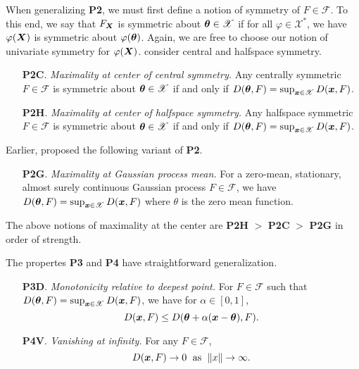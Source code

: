 When generalizing \textbf{P2}, we must first define a notion of symmetry of $F
\in \mathscr{F}$.
To this end, we say that $F_{\bm{X}}$ is symmetric about $\bm{\theta} \in \mathscr{X}$
if for all $\varphi \in \mathscr{X}^*$, we have $\varphi(\bm{X})$ is symmetric
about $\varphi(\bm{\theta})$.
Again, we are free to choose our notion of univariate symmetry for
$\varphi(\bm{X})$.
\textcite{gijbels-nagy-2017} consider central and halfspace symmetry.

\begin{enumerate}
    \item[\textbf{P2C}.] \emph{Maximality at center of central symmetry.}
    Any centrally symmetric $F \in \mathscr{F}$ is symmetric about $\bm{\theta} \in
    \mathscr{X}$ if and only if $D(\bm{\theta}, F) = \sup_{\bm{x} \in \mathscr{X}}
    D(\bm{x}, F)$.

    \item[\textbf{P2H}.] \emph{Maximality at center of halfspace symmetry.}
    Any halfspace symmetric $F \in \mathscr{F}$ is symmetric about $\bm{\theta} \in
    \mathscr{X}$ if and only if $D(\bm{\theta}, F) = \sup_{\bm{x} \in \mathscr{X}}
    D(\bm{x}, F)$.
\end{enumerate}

Earlier, \textcite{reyes-battey-2016} proposed the following variant of
\textbf{P2}.
\begin{enumerate}
    \item[\textbf{P2G}.] \emph{Maximality at Gaussian process mean.}
    For a zero-mean, stationary, almost surely continuous Gaussian process $F
    \in \mathscr{F}$, we have $D(\bm{\theta}, F) = \sup_{\bm{x} \in \mathscr{X}} D(\bm{x},
    F)$ where $\theta$ is the zero mean function.
\end{enumerate}
The above notions of maximality at the center are \textbf{P2H} $>$
\textbf{P2C} $>$ \textbf{P2G} in order of strength.

The propertes \textbf{P3} and \textbf{P4} have straightforward generalization.
\begin{enumerate}
    \item[\textbf{P3D}.] \emph{Monotonicity relative to deepest point.}
    For $F \in \mathscr{F}$ such that $D(\bm{\theta}, F) = \sup_{\bm{x} \in \mathscr{X}}
    D(\bm{x}, F)$, we have for $\alpha \in [0, 1]$,
    \begin{equation}
        D(\bm{x}, F) \leq D(\bm{\theta} + \alpha(\bm{x} - \bm{\theta}), F).
    \end{equation}

    \item[\textbf{P4V}.] \emph{Vanishing at infinity.} For any $F \in
    \mathscr{F}$,
    \begin{equation}
        D(\bm{x}, F) \to 0\;\text{ as }\; \Vert x \Vert \to \infty.
    \end{equation}
\end{enumerate}


